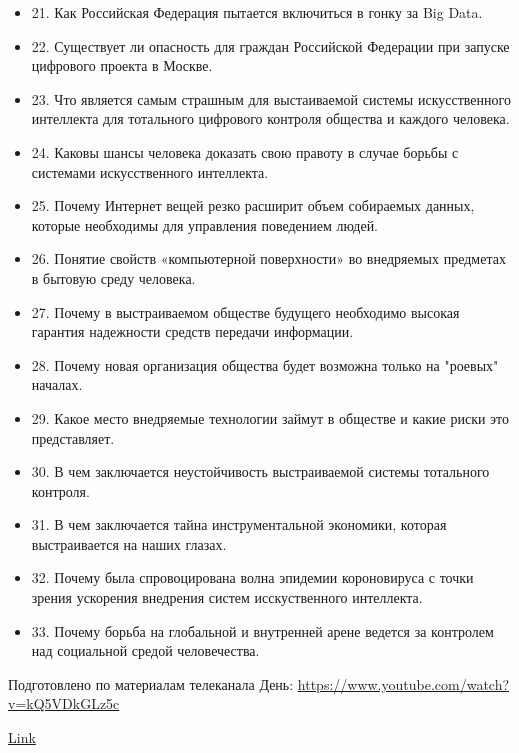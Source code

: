 \begin{itemize}
\item 21. Как Российская Федерация пытается включиться в гонку за Big Data.
\item 22. Существует ли опасность для граждан Российской Федерации при запуске цифрового проекта в Москве.
\item 23. Что является самым страшным для выстаиваемой системы искусственного интеллекта для тотального цифрового контроля общества и каждого человека.
\item 24. Каковы шансы человека доказать свою правоту в случае борьбы с системами искусственного интеллекта.
\item 25. Почему Интернет вещей резко расширит объем собираемых данных, которые необходимы для управления поведением людей.
\item 26. Понятие свойств «компьютерной поверхности» во внедряемых предметах в бытовую среду человека.
\item 27. Почему в выстраиваемом обществе будущего необходимо высокая гарантия надежности средств передачи информации.
\item 28. Почему новая организация общества будет возможна только на "роевых" началах.
\item 29. Какое место внедряемые технологии займут в обществе и какие риски это представляет.
\item 30. В чем заключается неустойчивость выстраиваемой системы тотального контроля.
\item 31. В чем заключается тайна инструментальной экономики, которая выстраивается на наших глазах.
\item 32. Почему была спровоцирована волна эпидемии короновируса с точки зрения ускорения внедрения систем исскуственного интеллекта.
\item 33. Почему борьба на глобальной и внутренней арене ведется за контролем над социальной средой человечества.
\end{itemize}

Подготовлено по материалам телеканала День: \url{https://www.youtube.com/watch?v=kQ5VDkGLz5c}

\href{https://l.facebook.com/l.php?u=https%3A%2F%2Fgeopolitikym.site%2Fot-bilderberga-k-gulagbergu-kak-globalnaya-elita-stroit-elektronnyj-konclager%2F%3Ffbclid%3DIwAR2STwnETlzpyNSDpL7P24IUX3S9WvWJB3Ab1Nc0EsgWvOaiteQc_z4j17c&h=AT1wbjkDVgFxalonLp4tcLk7UcepD4MGhTKyYPTvOLOHSSxiwOokqhs5BrD4Ej6pVt2BnHWiM3IqQA22Bk3bwqIrzI6AwQAWqvau4pGchOJOw6ZvAhA9uLCBIwR61e830dNk3u4f0eC4H1DireSmfYmKig5BljlSpF9wkJgEMhSilbUeVsMKi9WZOOY_KP2KCR9O4X0OLwwnDTcSZXvaq0V-fM3d7k4w4oWEt_MyMW7-IDbmYgecAuf6AEwoImloPpur2S6Kt0Lw_aP9u684QDEK14JAffEYHjL4hl5Th9n_QT-Hx7cVZ6Psm7jTV0q_UI9zuPfmjAg8Z-HFM3nW83cj7A1wyBs5sdDQti1XKVmgM-lvKUx38sj0FCMEFZhJsOEFvoGWmxUYERpTRG_Eb1ykfsTo4aQ-ToXtYXRJYJOth8h_K3f5balQdFRXyTQWP7gqDr1FbJ9w8PxDRgcvjWZn_aV8n6sR05RordJB4GjgJ_mDl6nzpbP8OjCLkHzFBJVnqPaCIswsvR7_DxYwU61bjGU0eGr8hw9H_ogPD_ztb4I_TGGfo77G_OGHku3TUAu2CTkxw-4IbN00iv9sM6jRE_SuBWTviUIfDDtKCyNX1qJF792st5kk5YLmdCmbgBzT0dgi0i3p5L0}{Link} 

